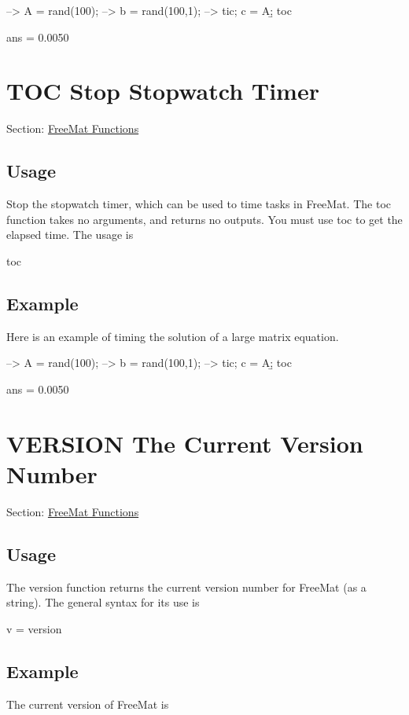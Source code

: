 \begin{DoxyVerbInclude}
--> A = rand(100);
--> b = rand(100,1);
--> tic; c = A\b; toc

ans = 
    0.0050 
\end{DoxyVerbInclude}
 \hypertarget{freemat_toc}{}\section{T\-O\-C Stop Stopwatch Timer}\label{freemat_toc}
Section\-: \hyperlink{sec_freemat}{Free\-Mat Functions} \hypertarget{vtkwidgets_vtkxyplotwidget_Usage}{}\subsection{Usage}\label{vtkwidgets_vtkxyplotwidget_Usage}
Stop the stopwatch timer, which can be used to time tasks in Free\-Mat. The {\ttfamily toc} function takes no arguments, and returns no outputs. You must use {\ttfamily toc} to get the elapsed time. The usage is \begin{DoxyVerb}  toc
\end{DoxyVerb}
 \hypertarget{variables_struct_Example}{}\subsection{Example}\label{variables_struct_Example}
Here is an example of timing the solution of a large matrix equation.


\begin{DoxyVerbInclude}
--> A = rand(100);
--> b = rand(100,1);
--> tic; c = A\b; toc

ans = 
    0.0050 
\end{DoxyVerbInclude}
 \hypertarget{freemat_version}{}\section{V\-E\-R\-S\-I\-O\-N The Current Version Number}\label{freemat_version}
Section\-: \hyperlink{sec_freemat}{Free\-Mat Functions} \hypertarget{vtkwidgets_vtkxyplotwidget_Usage}{}\subsection{Usage}\label{vtkwidgets_vtkxyplotwidget_Usage}
The {\ttfamily version} function returns the current version number for Free\-Mat (as a string). The general syntax for its use is \begin{DoxyVerb}    v = version
\end{DoxyVerb}
 \hypertarget{variables_struct_Example}{}\subsection{Example}\label{variables_struct_Example}
The current version of Free\-Mat is


